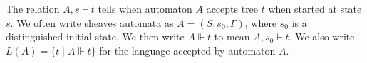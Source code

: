 
The relation $A,s \vdash t$ tells when automaton $A$ accepts tree $t$
when started at state $s$.
We often write sheaves automata as $A = (S,s_0,\Gamma)$, where $s_0$ is a
distinguished initial state.
We then write $A\Vdash t$ to mean $A,s_0\vdash t$.
%
We also write $L(A)=\{t\mid A\Vdash t\}$ for the language accepted by
automaton $A$.

